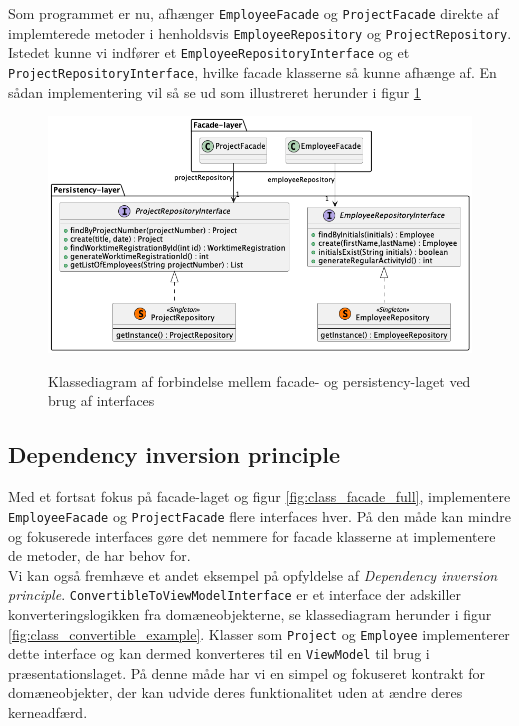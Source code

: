 Som programmet er nu, afhænger \texttt{EmployeeFacade} og \texttt{ProjectFacade} direkte af implemterede metoder i henholdsvis \texttt{EmployeeRepository} og \texttt{ProjectRepository}. Istedet kunne vi indfører et \texttt{EmployeeRepositoryInterface} og et \texttt{ProjectRepositoryInterface}, hvilke facade klasserne så kunne afhænge af. En sådan implementering vil så se ud som illustreret herunder i figur \ref{fig:class_facade_persistency_improved}
\begin{figure}[H]
    \centering
    \caption{Klassediagram af forbindelse mellem facade- og persistency-laget ved brug af interfaces}
    \includegraphics[width = 12cm, keepaspectratio]{TaskFusion/out/assets/diagrams/class_persistency_to_facade_improved/persistency_to_facade_example.png}
    \label{fig:class_facade_persistency_improved}
\end{figure}

\subsection{Dependency inversion principle} \label{sec:solid_d}
Med et fortsat fokus på facade-laget og figur \ref{fig:class_facade_full}, implementere \texttt{EmployeeFacade} og \texttt{ProjectFacade} flere interfaces hver. På den måde kan mindre og fokuserede interfaces gøre det nemmere for facade klasserne at implementere de metoder, de har behov for.
\\
Vi kan også fremhæve et andet eksempel på opfyldelse af \textit{Dependency inversion principle}. \texttt{ConvertibleToViewModelInterface} er et interface der adskiller konverteringslogikken fra domæneobjekterne, se klassediagram herunder i figur \ref{fig:class_convertible_example}. Klasser som \texttt{Project} og \texttt{Employee} implementerer dette interface og kan dermed konverteres til en \texttt{ViewModel} til brug i præsentationslaget. På denne måde har vi en simpel og fokuseret kontrakt for domæneobjekter, der kan udvide deres funktionalitet uden at ændre deres kerneadfærd. 

